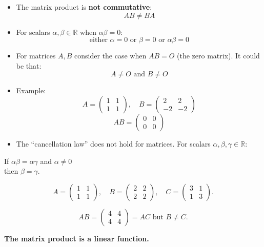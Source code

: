 \documentclass[a4paper, 12pt]{article}
\begin{document}
\begin{itemize}
    \item The matrix product is \textbf{not commutative}:
    \[ AB \neq BA \]

    \item For scalars $\alpha, \beta \in \mathbb{R}$ when $\alpha\beta = 0$:
    \[ \text{either } \alpha = 0 \text{ or } \beta = 0 \text{ or } \alpha\beta = 0 \]

    \item For matrices $A, B$ consider the case when $AB = O$ (the zero matrix). It could be that:
    \[ A \neq O \text{ and } B \neq O \]

    \item Example:
    \[ A = \begin{pmatrix} 1 & 1 \\ 1 & 1 \end{pmatrix}, \quad B = \begin{pmatrix} 2 & 2 \\ -2 & -2 \end{pmatrix} \]
    \[ AB = \begin{pmatrix} 0 & 0 \\ 0 & 0 \end{pmatrix} \]

    \item The ``cancellation law'' does not hold for matrices. For scalars $\alpha, \beta, \gamma \in \mathbb{R}$:
\end{itemize}



If $\alpha \beta = \alpha \gamma$ and $\alpha \neq 0$ \\
then $\beta = \gamma$.

\[
A = \begin{pmatrix}
1 & 1 \\
1 & 1
\end{pmatrix}, \quad
B = \begin{pmatrix}
2 & 2 \\
2 & 2
\end{pmatrix}, \quad
C = \begin{pmatrix}
3 & 1 \\
1 & 3
\end{pmatrix}.
\]

\[
AB = \begin{pmatrix}
4 & 4 \\
4 & 4
\end{pmatrix} = AC \text{ but } B \neq C.
\]

\textbf{The matrix product is a linear function.}
\end{document}

